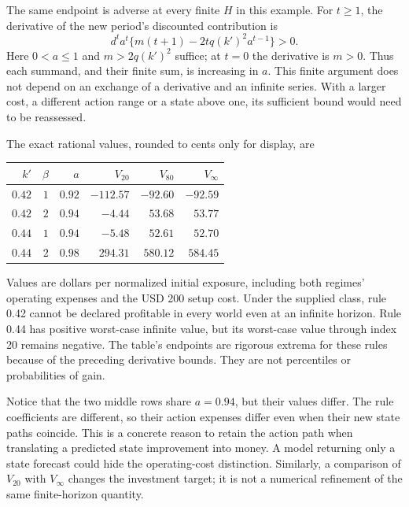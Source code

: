 The same endpoint is adverse at every finite $H$ in this example. For
$t\geq1$, the derivative of the new period's discounted contribution is
\begin{equation}
 d^t a^t\{m(t+1)-2tq(k')^2a^{t-1}\}>0.
 \label{exec17:s6-finite-monotone}
\end{equation}
Here $0<a\leq1$ and $m>2q(k')^2$ suffice; at $t=0$ the derivative
is $m>0$. Thus each summand, and their finite sum, is increasing in
$a$. This finite argument does not depend on an exchange of a derivative
and an infinite series. With a larger cost, a different action range or
a state above one, its sufficient bound would need to be reassessed.

The exact rational values, rounded to cents only for display, are
\begin{center}
\begin{tabular}{rrrrrr}
\toprule
$k'$ & $\beta$ & $a$ & $V_{20}$ & $V_{80}$ & $V_\infty$\\
\midrule
$0.42$ & $1$ & $0.92$ & $-112.57$ & $-92.60$ & $-92.59$\\
$0.42$ & $2$ & $0.94$ & $-4.44$ & $53.68$ & $53.77$\\
$0.44$ & $1$ & $0.94$ & $-5.48$ & $52.61$ & $52.70$\\
$0.44$ & $2$ & $0.98$ & $294.31$ & $580.12$ & $584.45$\\
\bottomrule
\end{tabular}
\end{center}
Values are dollars per normalized initial exposure, including both regimes'
operating expenses and the USD 200 setup cost. Under the supplied class,
rule 0.42 cannot be declared profitable in every world even at an infinite
horizon. Rule 0.44 has positive worst-case infinite value, but its
worst-case value through index 20 remains negative. The table's endpoints
are rigorous extrema for these rules because of the preceding derivative
bounds. They are not percentiles or probabilities of gain.

Notice that the two middle rows share $a=0.94$, but their values differ.
The rule coefficients are different, so their action expenses differ even
when their new state paths coincide. This is a concrete reason to retain
the action path when translating a predicted state improvement into money.
A model returning only a state forecast could hide the operating-cost
distinction. Similarly, a comparison of $V_{20}$ with $V_\infty$ changes
the investment target; it is not a numerical refinement of the same
finite-horizon quantity.

